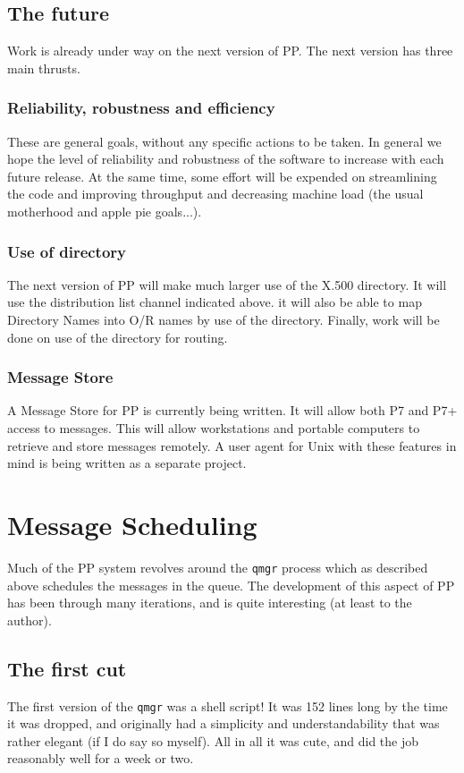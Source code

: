 \subsection{The future}
Work is already under way on the next version of PP. The next version
has three main thrusts.

\subsubsection {Reliability, robustness and efficiency}
These are general goals, without any specific actions to be taken. In
general we hope the level of reliability and robustness of the
software to increase with each future release. At the same time, some
effort will be expended on streamlining the code and improving
throughput and decreasing machine load (the usual motherhood and apple
pie goals...).

\subsubsection {Use of directory}
The next version of PP will make much larger use of the X.500
directory. It will use the distribution list channel indicated above.
it will also be able to map Directory Names into O/R names by use of
the directory. Finally, work will be done on use of the directory for
routing. 

\subsubsection{Message Store}
A Message Store for PP is currently being written. It will allow
both P7 and P7+ access to messages. This will allow workstations and
portable computers to retrieve and store messages remotely. A user
agent for Unix with these features in mind is being written as a
separate project.

\section{Message Scheduling}
Much of the PP system revolves around the \verb|qmgr| process which as
described above schedules the messages in the queue. The development
of this aspect of PP has been through many iterations, and is quite
interesting (at least to the author).

\subsection{The first cut}
The first version of the \verb|qmgr| was a shell script!
It was 152 lines long by the time it was dropped, and originally had a
simplicity and understandability that was rather elegant (if I do say
so myself). All in all it was cute, and did the job reasonably well
for a week or two. 

